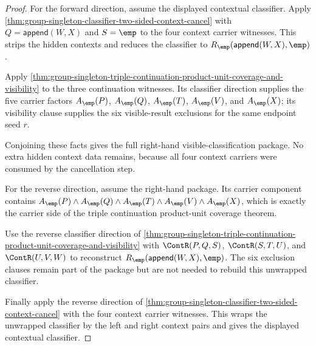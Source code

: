 \begin{proof}
For the forward direction, assume the displayed contextual classifier. Apply
\autoref{thm:group-singleton-classifier-two-sided-context-cancel} with
$Q=\mathsf{append}(W,X)$ and $S=\emp$ to the four context carrier witnesses.
This strips the hidden contexts and reduces the classifier to
$R_{\emp}(\mathsf{append}(W,X),\emp)$.

Apply
\autoref{thm:group-singleton-triple-continuation-product-unit-coverage-and-visibility}
to the three continuation witnesses. Its classifier direction supplies the
five carrier factors $A_{\emp}(P)$, $A_{\emp}(Q)$, $A_{\emp}(T)$,
$A_{\emp}(V)$, and $A_{\emp}(X)$; its visibility clause supplies the six
visible-result exclusions for the same endpoint seed $r$.

Conjoining these facts gives the full right-hand visible-classification
package. No extra hidden context data remains, because all four context
carriers were consumed by the cancellation step.

For the reverse direction, assume the right-hand package. Its carrier component
contains $A_{\emp}(P)\land A_{\emp}(Q)\land A_{\emp}(T)\land A_{\emp}(V)\land
A_{\emp}(X)$, which is exactly the carrier side of the triple continuation
product-unit coverage theorem.

Use the reverse classifier direction of
\autoref{thm:group-singleton-triple-continuation-product-unit-coverage-and-visibility}
with $\ContR(P,Q,S)$, $\ContR(S,T,U)$, and $\ContR(U,V,W)$ to reconstruct
$R_{\emp}(\mathsf{append}(W,X),\emp)$. The six exclusion clauses remain part
of the package but are not needed to rebuild this unwrapped classifier.

Finally apply the reverse direction of
\autoref{thm:group-singleton-classifier-two-sided-context-cancel} with the four
context carrier witnesses. This wraps the unwrapped classifier by the left and
right context pairs and gives the displayed contextual classifier.
\end{proof}
